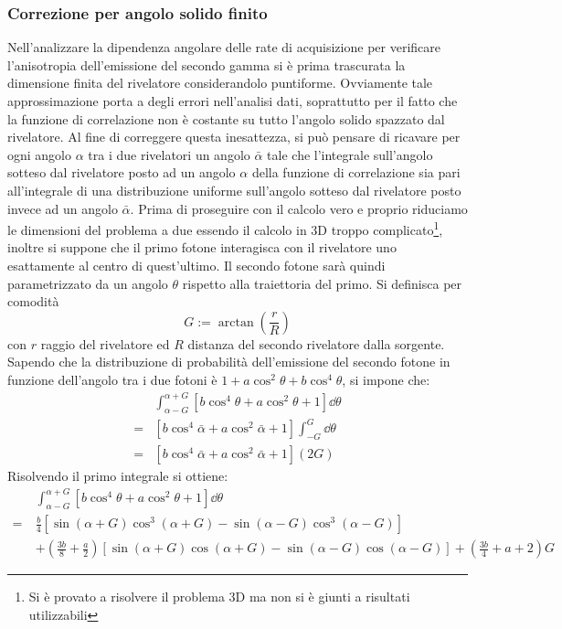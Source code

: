 \subsubsection{Correzione per angolo solido finito}

Nell'analizzare la dipendenza angolare delle rate di acquisizione per verificare l'anisotropia dell'emissione del secondo gamma si è prima trascurata la dimensione finita del rivelatore 
considerandolo puntiforme. Ovviamente tale approssimazione porta a degli errori nell'analisi dati, soprattutto per il fatto che la funzione di correlazione non è costante su tutto l'angolo solido
spazzato dal rivelatore. Al fine di correggere questa inesattezza, si può pensare di ricavare per ogni angolo $\alpha$ tra i due rivelatori un angolo $\bar\alpha$ tale che l'integrale sull'angolo
sotteso dal rivelatore posto ad un angolo $\alpha$ della funzione di correlazione sia pari all'integrale di una distribuzione uniforme sull'angolo sotteso dal rivelatore posto invece ad un angolo 
$\bar\alpha$. Prima di proseguire con il calcolo vero e proprio riduciamo le dimensioni del problema a due essendo il calcolo in 3D troppo complicato\footnote{
Si è provato a risolvere il problema 3D ma non si è giunti a risultati utilizzabili}, inoltre si suppone che
il primo fotone interagisca con il rivelatore uno esattamente al centro di quest'ultimo. Il secondo fotone sarà quindi parametrizzato da un angolo $\theta$ rispetto alla traiettoria
del primo. Si definisca per comodità 
\begin{equation}
	G := \arctan{\left(\frac{r}{R}\right)}
\end{equation}
con $ r $ raggio del rivelatore ed $ R $ distanza del secondo rivelatore dalla sorgente. Sapendo che la distribuzione di probabilità dell'emissione del secondo fotone in funzione dell'angolo tra i due fotoni è $1 + a \cos ^ 2 \theta + b \cos^4 \theta$, si impone che:
\begin{equation}
\begin{split}
	& \int_{\alpha -G}^{\alpha +G} \left[ b \cos^4 \theta + a \cos ^ 2  \theta + 1 \right] \dd \theta \\
	= & \left[ b \cos^4 \bar\alpha + a \cos ^ 2 \bar\alpha + 1 \right] \int_{-G}^{G} \dd\theta \\
	= & \left[ b \cos^4 \bar\alpha + a \cos ^ 2 \bar \alpha + 1 \right] \left( 2G \right)
\end{split}
\end{equation}
Risolvendo il primo integrale si ottiene:
\begin{equation}
\begin{split}
	& \int_{\alpha -G}^{\alpha + G} \left[ b \cos^4 \theta + a \cos ^ 2  \theta + 1 \right] \dd \theta \\
	=\ & \frac{b}{4}\left[ \sin \left( \alpha + G \right) \cos^3 \left( \alpha + G \right) - \sin \left( \alpha - G \right) \cos^3 \left( \alpha - G \right) \right] \\
	& + \left( \frac{3b}{8} + \frac{a}{2} \right)\left[ \sin \left( \alpha + G \right) \cos \left( \alpha + G \right) - \sin \left( \alpha - G \right) \cos \left( \alpha - G \right) \right] + \left( \frac{3b}{4} + a + 2 \right)G
\end{split}
\end{equation}
